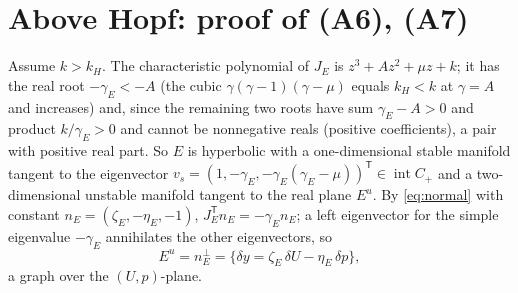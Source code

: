 \documentclass[11pt,a4paper]{article}
\numberwithin{equation}{section}
\theoremstyle{remark}\newtheorem{remark}[theorem]{Remark}
\DeclareMathOperator{\inter}{int}
\begin{document}
\section{Above Hopf: proof of (A6), (A7)}\label{sec:above}
Assume $k>k_H$. The characteristic polynomial of $J_E$ is $z^3+Az^2+\mu z+k$; it has the real root
$-\gamma_E<-A$ (the cubic $\gamma(\gamma-1)(\gamma-\mu)$ equals $k_H<k$ at $\gamma=A$ and increases) and, since the
remaining two roots have sum $\gamma_E-A>0$ and product $k/\gamma_E>0$ and cannot be nonnegative reals (positive
coefficients), a pair with positive real part. So $E$ is hyperbolic with a one-dimensional stable manifold tangent
to the eigenvector $v_s=(1,-\gamma_E,-\gamma_E(\gamma_E-\mu))^{\mathsf T}\in\inter C_+$ and a two-dimensional
unstable manifold tangent to the real plane $E^u$. By \eqref{eq:normal} with constant $n_E=(\zeta_E,-\eta_E,-1)$,
$J_E^{\mathsf T}n_E=-\gamma_En_E$; a left eigenvector for the simple eigenvalue $-\gamma_E$ annihilates the other
eigenvectors, so
\begin{equation}\label{eq:Eu}
E^u=n_E^{\perp}=\{\delta y=\zeta_E\,\delta U-\eta_E\,\delta p\},
\end{equation}
a graph over the $(U,p)$-plane.
\end{document}
